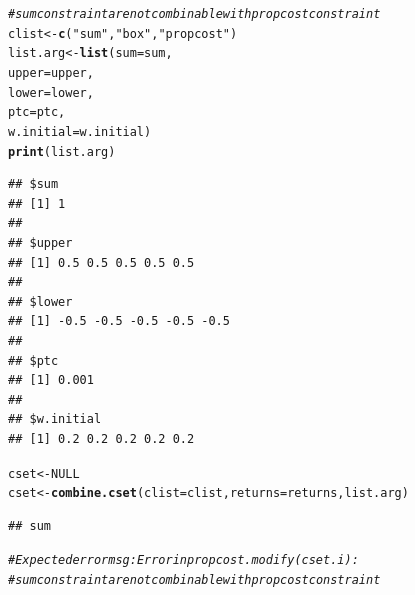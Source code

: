 \documentclass{uwstat518}\usepackage[]{graphicx}\usepackage[]{color}
\makeatletter
\newcommand{\hlstr}[1]{\textcolor[rgb]{0.192,0.494,0.8}{#1}}%
\newcommand{\hlcom}[1]{\textcolor[rgb]{0.678,0.584,0.686}{\textit{#1}}}%
\newcommand{\hlkwd}[1]{\textcolor[rgb]{0.737,0.353,0.396}{\textbf{#1}}}%
\newenvironment{kframe}{%
 \def\at@end@of@kframe{}%
 \ifinner\ifhmode%
  \def\at@end@of@kframe{\end{minipage}}%
  \begin{minipage}{\columnwidth}%
 \fi\fi%
 \def\FrameCommand##1{\hskip\@totalleftmargin \hskip-\fboxsep
 \colorbox{shadecolor}{##1}\hskip-\fboxsep
     \hskip-\linewidth \hskip-\@totalleftmargin \hskip\columnwidth}%
 \MakeFramed {\advance\hsize-\width
   \@totalleftmargin\z@ \linewidth\hsize
   \@setminipage}}%
 {\par\unskip\endMakeFramed%
 \at@end@of@kframe}
\newenvironment{knitrout}{}{} %
\makeatother
\begin{document}
\begin{knitrout}
\begin{kframe}
\begin{alltt}
\hlcom{# sum constraint are not combinable with propcost constraint}
clist <- \hlkwd{c}(\hlstr{"sum"},\hlstr{"box"},\hlstr{"propcost"})
list.arg <- \hlkwd{list}( sum=sum,
                  upper=upper,
                  lower=lower,
                  ptc=ptc,
                  w.initial=w.initial)
\hlkwd{print}(list.arg)
\end{alltt}
\begin{verbatim}
## $sum
## [1] 1
## 
## $upper
## [1] 0.5 0.5 0.5 0.5 0.5
## 
## $lower
## [1] -0.5 -0.5 -0.5 -0.5 -0.5
## 
## $ptc
## [1] 0.001
## 
## $w.initial
## [1] 0.2 0.2 0.2 0.2 0.2
\end{verbatim}
\begin{alltt}
cset <- NULL
cset <-\hlkwd{combine.cset}(clist=clist,returns=returns,list.arg)
\end{alltt}
\begin{verbatim}
## sum
\end{verbatim}


{\ttfamily\noindent\bfseries\color{errorcolor}{\#\# Error: sum constraint are not combinable with propcost constraint}}\begin{alltt}
\hlcom{# Expected error msg: Error in propcost.modify(cset.i) : }
\hlcom{# sum constraint are not combinable with propcost constraint}
\end{alltt}
\end{kframe}
\end{knitrout}
\end{document}
